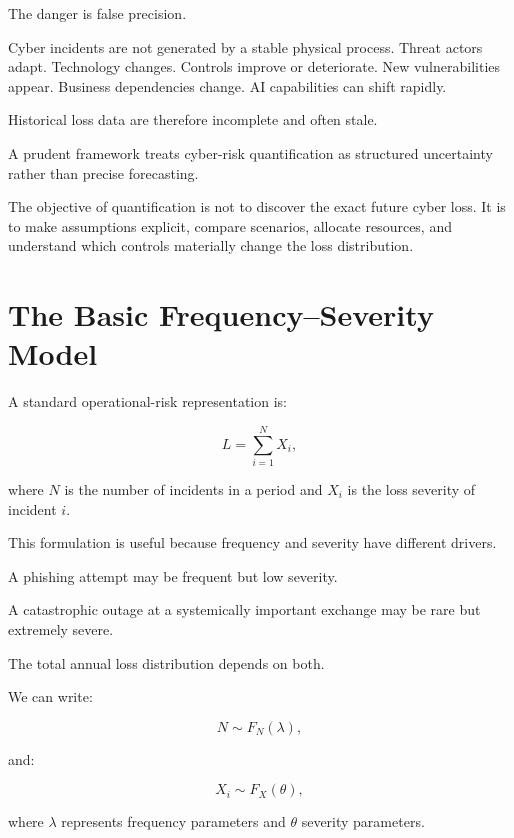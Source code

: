 The danger is false precision.

Cyber incidents are not generated by a stable physical process. Threat actors adapt. Technology changes. Controls improve or deteriorate. New vulnerabilities appear. Business dependencies change. AI capabilities can shift rapidly.

Historical loss data are therefore incomplete and often stale.

A prudent framework treats cyber-risk quantification as structured uncertainty rather than precise forecasting.

\begin{intuition}
The objective of quantification is not to discover the exact future cyber loss. It is to make assumptions explicit, compare scenarios, allocate resources, and understand which controls materially change the loss distribution.
\end{intuition}

\section{The Basic Frequency--Severity Model}

A standard operational-risk representation is:

\begin{equation}
L = \sum_{i=1}^{N} X_i,
\end{equation}

where \(N\) is the number of incidents in a period and \(X_i\) is the loss severity of incident \(i\).

This formulation is useful because frequency and severity have different drivers.

A phishing attempt may be frequent but low severity.

A catastrophic outage at a systemically important exchange may be rare but extremely severe.

The total annual loss distribution depends on both.

We can write:

\begin{equation}
N \sim F_N(\lambda),
\end{equation}

and:

\begin{equation}
X_i \sim F_X(\theta),
\end{equation}

where \(\lambda\) represents frequency parameters and \(\theta\) severity parameters.

